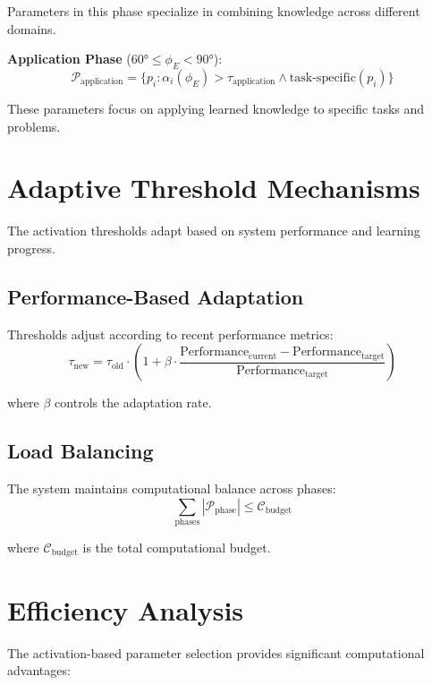 Parameters in this phase specialize in combining knowledge across different domains.

\textbf{Application Phase} ($60° \leq \phi_E < 90°$):
\begin{equation}
\mathcal{P}_{\text{application}} = \{p_i : \alpha_i(\phi_E) > \tau_{\text{application}} \land \text{task-specific}(p_i)\}
\end{equation}

These parameters focus on applying learned knowledge to specific tasks and problems.

\section{Adaptive Threshold Mechanisms}

The activation thresholds adapt based on system performance and learning progress.

\subsection{Performance-Based Adaptation}

Thresholds adjust according to recent performance metrics:
\begin{equation}
\tau_{\text{new}} = \tau_{\text{old}} \cdot \left(1 + \beta \cdot \frac{\text{Performance}_{\text{current}} - \text{Performance}_{\text{target}}}{\text{Performance}_{\text{target}}}\right)
\end{equation}

where $\beta$ controls the adaptation rate.

\subsection{Load Balancing}

The system maintains computational balance across phases:
\begin{equation}
\sum_{\text{phases}} |\mathcal{P}_{\text{phase}}| \leq \mathcal{C}_{\text{budget}}
\end{equation}

where $\mathcal{C}_{\text{budget}}$ is the total computational budget.

\section{Efficiency Analysis}

The activation-based parameter selection provides significant computational advantages:

